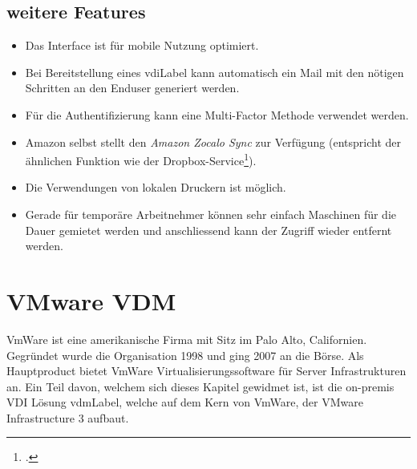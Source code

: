 \subsection{weitere Features}
\begin{itemize}
	\item Das Interface ist für mobile Nutzung optimiert.
	\item Bei Bereitstellung eines \Gls{vdiLabel} kann automatisch ein Mail mit den nötigen Schritten an den Enduser generiert werden.
	\item Für die Authentifizierung kann eine Multi-Factor Methode verwendet werden.
	\item Amazon selbst stellt den \textit{Amazon Zocalo Sync} zur Verfügung (entspricht der ähnlichen Funktion wie der Dropbox-Service\footcite{Dropbox_2014-11-15}).
	\item Die Verwendungen von lokalen Druckern ist möglich.
	\item Gerade für temporäre Arbeitnehmer können sehr einfach Maschinen für die Dauer gemietet werden und anschliessend kann der Zugriff wieder entfernt werden.
\end{itemize}

\section{VMware VDM}
VmWare ist eine amerikanische Firma mit Sitz im Palo Alto, Californien. Gegründet wurde die Organisation 1998 und ging 2007 an die Börse.
Als Hauptproduct bietet VmWare Virtualisierungssoftware für Server Infrastrukturen an. Ein Teil davon, welchem sich dieses Kapitel gewidmet ist, ist die on-premis VDI Lösung \Gls{vdmLabel}, welche auf dem Kern von VmWare, der VMware Infrastructure 3 aufbaut.

